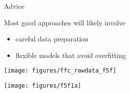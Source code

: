 \documentclass{beamer}
\begin{document}
\begin{frame}

\begin{center}
\LARGE{Advice}
\end{center}

\end{frame}
\begin{frame}

Most good approaches will likely involve \pause
\begin{itemize}
\item careful data preparation
\pause
\item flexible models that avoid overfitting
\end{itemize}

\end{frame}
\begin{frame}

\begin{center}
%
%
\end{center}

\end{frame}
\begin{frame}

\begin{center}
\texttt{[image: figures/ffc\_rawdata\_f5f]}
\end{center}

\end{frame}
\begin{frame}

\begin{center}
\end{center}

\end{frame}
\begin{frame}

\begin{center}
\texttt{[image: figures/f5f1a]}
\end{center}

\end{frame}
\begin{frame}

\begin{center}
%
%
%
\end{center}

\end{frame}
\end{document}
